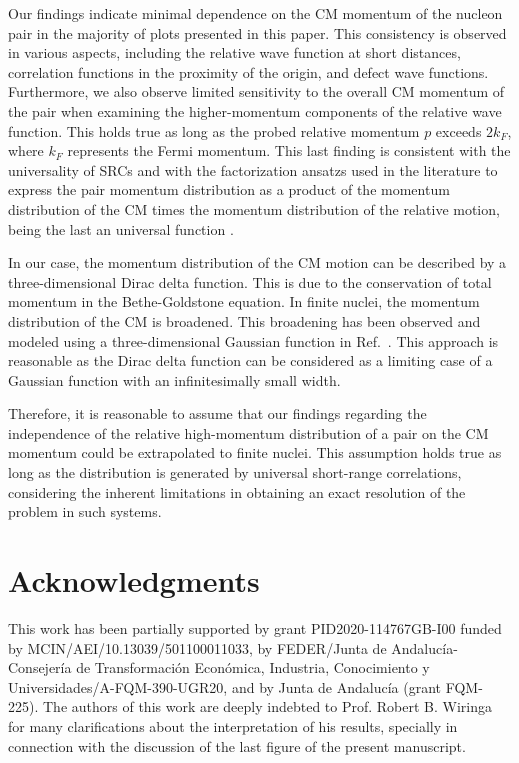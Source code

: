 \documentclass[aps,twocolumn,showpacs,preprintnumbers,amsmath,amssymb,nofootinbib,superscriptaddress,showkeys,noeprint]{revtex4-1}
\begin{document}
Our findings indicate minimal dependence on the CM momentum of the
nucleon pair in the majority of plots presented in this paper.  This
consistency is observed in various aspects, including the relative
wave function at short distances, correlation functions in the
proximity of the origin, and defect wave functions. Furthermore, we
also observe limited sensitivity to the overall CM momentum of the
pair when examining the higher-momentum components of the relative
wave function. This holds true as long as the probed relative momentum
$p$ exceeds $2k_F$, where $k_F$ represents the Fermi momentum. This
last finding is consistent with the universality of SRCs and with the
factorization ansatzs used in the literature to express the pair
momentum distribution as a product of the momentum distribution of the
CM times the momentum distribution of the relative motion, being the
last an universal function \cite{Cohen:2018gzh, Vanhalst:2014cqa,
  Weiss:2016obx, Alvioli:2016wwp, CiofidegliAtti:2017tnm}.

In our case, the momentum distribution of the CM motion can be
described by a three-dimensional Dirac delta function. This is due to
the conservation of total momentum in the Bethe-Goldstone equation. In
finite nuclei, the momentum distribution of the CM is broadened. This
broadening has been observed and modeled using a three-dimensional
Gaussian function in Ref.~\cite{Cohen:2018gzh}.  This approach is
reasonable as the Dirac delta function can be considered as a limiting
case of a Gaussian function with an infinitesimally small width.

Therefore, it is reasonable to assume that our findings regarding the
independence of the relative high-momentum distribution of a pair on
the CM momentum could be extrapolated to finite nuclei. This
assumption holds true as long as the distribution is generated by
universal short-range correlations, considering the inherent
limitations in obtaining an exact resolution of the problem in such
systems.


\section{Acknowledgments}
This work has been partially supported by grant PID2020-114767GB-I00
funded by MCIN/AEI/10.13039/501100011033, by FEDER/Junta de
Andaluc\'ia-Consejer\'ia de Transformaci\'on Econ\'omica, Industria,
Conocimiento y Universidades/A-FQM-390-UGR20, and by Junta de
Andaluc\'ia (grant FQM-225). The authors of this work are deeply
indebted to Prof. Robert B. Wiringa for many clarifications about the
interpretation of his results, specially in connection with the
discussion of the last figure of the present manuscript.
\end{document}
